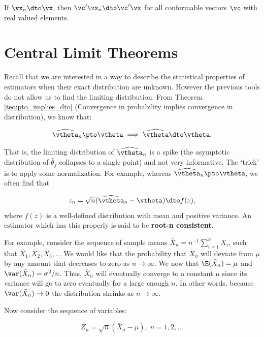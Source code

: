 \documentclass[english,12pt]{book}\usepackage[]{graphicx}\usepackage[]{xcolor}
\begin{document}
\begin{theorem}
If $\vx_n \dto \vx$, then $\vc'\vx_n \dto \vc'\vx$ for all conformable vectors $\vc$ with real valued elements.
\end{theorem}

\section{Central Limit Theorems}

Recall that we are interested in a way to describe the statistical properties of estimators when their exact distribution are unknown. However the previous tools do not allow us to find the limiting distribution. From Theorem \ref{teo:pto_implies_dto} (Convergence in probability implies convergence in distribution), we know that:

\begin{equation*}
  \widehat{\vtheta}_n\pto \vtheta \implies \widehat{\vtheta}\dto \vtheta.
\end{equation*}

That is, the limiting distribution of $\widehat{\vtheta}_n$ is a spike (the asymptotic distribution of $\widehat{\theta}_j$ collapses to a single point) and not very informative. The `trick' is to apply some normalization. For example, whereas $\widehat{\vtheta}_n\pto \vtheta$, we often find that

\begin{equation}
z_n = \sqrt{n}(\widehat{\vtheta}_n - \vtheta) \dto f(z),
\end{equation}
%
where $f(z)$ is a well-defined distribution with mean and positive variance. An estimator which has this properly is said to be \textbf{root-n consistent}.

For example, consider the sequence of sample means $\bar{X}_n = n^{-1}\sum_{i = 1}^nX_i$, such that $\bar{X}_1, \bar{X}_2, \bar{X}_3, ...$ We would like that the probability that $\bar{X}_n$ will deviate from $\mu$ by any amount that decreases to zero as $n\to \infty$. We now that $\E(\bar{X}_n ) = \mu$ and $\var(\bar{X}_n) = \sigma^2/n$. Thus, $\bar{X}_n$ will eventually converge to a constant $\mu$ since its variance will go to zero eventually for a large enough $n$. In other words, because $\var(\bar{X}_n)\to 0$ the distribution shrinks as $n\to\infty$. 


Now consider the sequence of variables:

\begin{equation}
  Z_n = \sqrt{n}\left(\bar{X}_n - \mu\right), \; n = 1, 2, ...
\end{equation}
\end{document}
